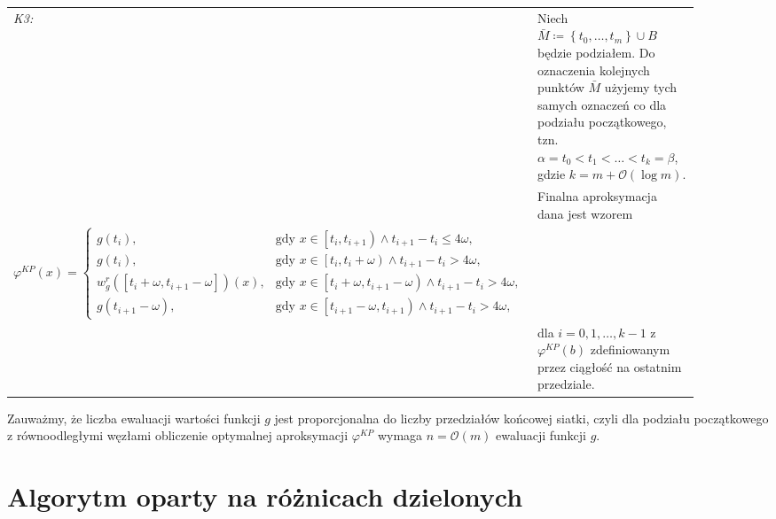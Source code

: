 \documentclass[oik, pdftex, man]{mgrwms}
\begin{document}
    \begin{table}[H]
        \begin{tabular}{p{0.045\linewidth} p{0.85\linewidth}}
        \textit{K3:}    & Niech $\bar{M} \coloneqq \left\{ t_{0}, \dots, t_{m} \right\} \cup B$ będzie podziałem. Do oznaczenia kolejnych punktów $\bar{M}$ użyjemy tych samych oznaczeń co dla podziału początkowego, tzn. $\alpha = t_{0} < t_{1} < \ldots < t_{k} = \beta$, gdzie $k = m + \mathcal{O}(\log m)$. \\
        & Finalna aproksymacja dana jest wzorem \\ \vspace{-15pt}
                        $$\varphi^{KP}(x)= \begin{cases}
                            g\left(t_{i}\right),                                                 &\text{gdy } x \in \left[t_{i}, t_{i+1}\right) \land t_{i+1}-t_{i} \leq 4 \omega, \\ 
                            g\left(t_{i}\right),                                                 &\text{gdy } x \in \left[t_{i}, t_{i}+\omega\right) \land t_{i+1}-t_{i}>4 \omega, \\ 
                            w_{g}^{r}\left(\left[t_{i}+\omega, t_{i+1}-\omega\right]\right)(x),  &\text{gdy } x \in\left[t_{i}+\omega, t_{i+1}-\omega\right) \land t_{i+1}-t_{i}>4 \omega, \\ 
                            g\left(t_{i+1}-\omega\right),                                        &\text{gdy } x \in\left[t_{i+1}-\omega, t_{i+1}\right) \land t_{i+1}-t_{i}>4 \omega,
                            \end{cases}$$ \vspace{-10pt} \\
                        & dla $i=0,1,\dots,k-1$ z $\varphi^{KP}(b) $ zdefiniowanym przez ciągłość na ostatnim przedziale. \\
        \end{tabular}
    \end{table}


    Zauważmy, że liczba ewaluacji wartości funkcji $g$ jest proporcjonalna do liczby przedziałów końcowej siatki, czyli dla podziału początkowego z równoodległymi węzłami obliczenie optymalnej aproksymacji $\varphi^{KP}$ wymaga $n = \mathcal{O}(m)$ ewaluacji funkcji $g$.

\section{Algorytm oparty na różnicach dzielonych}
\end{document}
